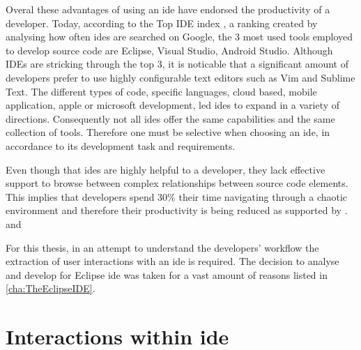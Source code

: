Overal these advantages of using an \gls{ide} have endorsed the productivity of a developer. Today, according to the Top IDE index 
, a ranking created by analysing how often \gls{ide}s are searched on Google, the 3 most used tools employed to develop source code are Eclipse, Visual Studio, Android Studio. Although \gls{IDE}s are stricking through the top 3, it is noticable that a significant amount of developers prefer to use highly configurable text editors such as Vim and Sublime Text. The different types of code, specific languages, cloud based, mobile application, apple or microsoft development, led \gls{ide}s to expand in a variety of directions. Consequently not all \gls{ide}s offer the same capabilities and the same collection of tools. Therefore one must be selective when choosing an \gls{ide}, in accordance to its development task and requirements. 

Even though that \gls{ide}s are highly helpful to a developer, they lack effective support to browse between complex relationships between source code elements. This implies that developers spend 30\% their time navigating through a chaotic environment and therefore their productivity is being reduced as supported by .  and 




For this thesis, in an attempt to understand the developers' workflow the extraction of user interactions with an \gls{ide} is required. The decision to analyse and develop for Eclipse \gls{ide} was taken for a vast amount of reasons listed in \ref{cha:TheEclipseIDE}.



\section{Interactions within \gls{ide}}


